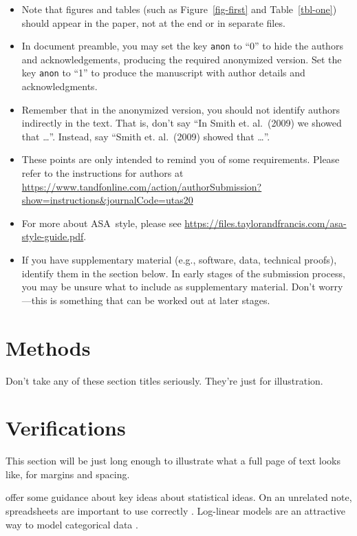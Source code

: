 \documentclass[
  12pt]{article}
\providecommand{\tightlist}{%
  \setlength{\itemsep}{0pt}\setlength{\parskip}{0pt}}\usepackage{longtable,booktabs,array}
\begin{document}
\begin{itemize}
\tightlist
\item
  Note that figures and tables (such as Figure~\ref{fig-first} and
  Table~\ref{tbl-one}) should appear in the paper, not at the end or in
  separate files.
\item
  In document preamble, you may set the key \texttt{anon} to ``0'' to hide the authors and acknowledgements,
  producing the required anonymized version. Set the key \texttt{anon} to ``1'' to produce the manuscript with author details and acknowledgments. 
\item
  Remember that in the anonymized version, you should not identify
  authors indirectly in the text. That is, don't say ``In Smith et.
  al.~(2009) we showed that \ldots{}''. Instead, say ``Smith et.
  al.~(2009) showed that \ldots{}''.
\item
  These points are only intended to remind you of some requirements.
  Please refer to the instructions for authors at
  \url{https://www.tandfonline.com/action/authorSubmission?show=instructions&journalCode=utas20}
\item
  For more about ASA~style, please see
  \url{https://files.taylorandfrancis.com/asa-style-guide.pdf}.
\item
  If you have supplementary material (e.g., software, data, technical
  proofs), identify them in the section below. In early stages of the
  submission process, you may be unsure what to include as supplementary
  material. Don't worry---this is something that can be worked out at
  later stages.
\end{itemize}

\section{Methods}\label{sec-meth}

Don't take any of these section titles seriously. They're just for
illustration.

\section{Verifications}\label{sec-verify}

This section will be just long enough to illustrate what a full page of
text looks like, for margins and spacing.

\addtolength{\textheight}{.5in}%

\citet{gelm:veht:2021} offer some guidance about key ideas about
statistical ideas. On an unrelated note, spreadsheets are important to
use correctly \citep{brom:woo:2018}. Log-linear models are an attractive
way to model categorical data \citep{bish:fien:1975}.
\end{document}
